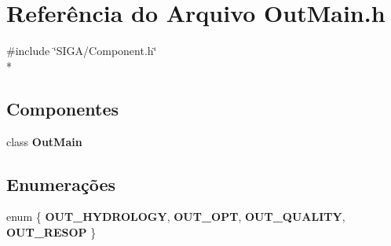\section{Referência do Arquivo Out\+Main.\+h}
\label{_out_main_8h}
{\ttfamily \#include \char`\"{}S\+I\+G\+A/\+Component.\+h\char`\"{}}\\*
\subsection*{Componentes}
\begin{DoxyCompactItemize}
\item 
class {\bf Out\+Main}
\end{DoxyCompactItemize}
\subsection*{Enumerações}
\begin{DoxyCompactItemize}
\item 
enum \{ {\bf O\+U\+T\+\_\+\+H\+Y\+D\+R\+O\+L\+O\+GY}, 
{\bf O\+U\+T\+\_\+\+O\+PT}, 
{\bf O\+U\+T\+\_\+\+Q\+U\+A\+L\+I\+TY}, 
{\bf O\+U\+T\+\_\+\+R\+E\+S\+OP}
 \}
\end{DoxyCompactItemize}
